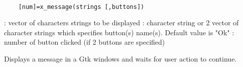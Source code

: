 \begin{mandesc}
  \\ %
\end{mandesc}
\label{x-message}
\begin{calling_sequence}
  \begin{verbatim}
    [num]=x_message(strings [,buttons])   
  \end{verbatim}
\end{calling_sequence}
\begin{parameters}
  \begin{varlist}
     : vector of characters strings to be displayed
     : character string or 2 vector of character strings which specifies button(s) name(s). Default value is "Ok"
     : number  of button clicked (if 2 buttons are specified)
  \end{varlist}
\end{parameters}
\begin{mandescription}
  Displays a message in a Gtk windows and waits for user action to continue. 
\end{mandescription}
\begin{examples}
  \begin{program}
  \end{program}
\end{examples}
\begin{manseealso}
      
\end{manseealso}

